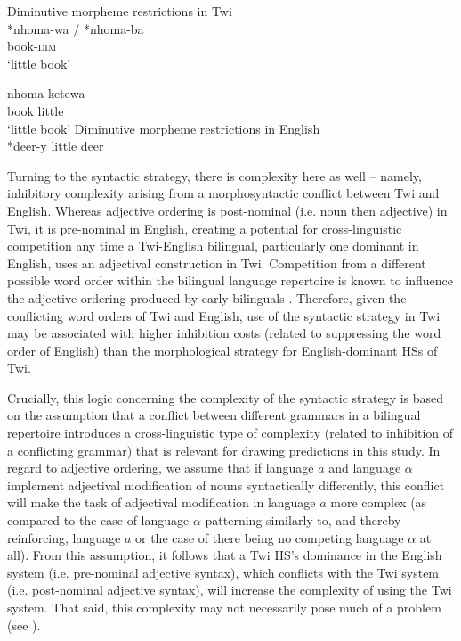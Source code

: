 \documentclass[output=paper,colorlinks,citecolor=brown]{langscibook}
\begin{document}
\ea \label{DimRestrictionsTwi}Diminutive morpheme restrictions in Twi\\
\ea
\gll  \label{ex:nhomawa}*nhoma-wa / *nhoma-ba \\
book-\textsc{dim} \\ 
\glt `little book'

\ex
\gll \label{ex:nhoma-ketewa}nhoma ketewa \\
book little \\
\glt `little book'
\z
\z
\pagebreak
\ea \label{DimRestrictionsEng}Diminutive morpheme restrictions in English\\
\ea \label{ex:deery}*deer-y
\ex \label{ex:little-deer}little deer
\z
\z


Turning to the syntactic strategy, there is complexity here as well -- namely, inhibitory complexity arising from a morphosyntactic conflict between Twi and English. Whereas adjective ordering is post-nominal (i.e. noun then adjective) in Twi, it is pre-nominal in English, creating a potential for cross-linguistic competition any time a Twi-English bilingual, particularly one dominant in English, uses an adjectival construction in Twi. Competition from a different possible word order within the bilingual language repertoire is known to influence the adjective ordering produced by early bilinguals \citep{Nicoladis2006}. Therefore, given the conflicting word orders of Twi and English, use of the syntactic strategy in Twi may be associated with higher inhibition costs (related to suppressing the word order of English) than the morphological strategy for English-dominant HSs of Twi.

Crucially, this logic concerning the complexity of the syntactic strategy is based on the assumption that a conflict between different grammars in a bilingual repertoire introduces a cross-linguistic type of complexity (related to inhibition of a conflicting grammar) that is relevant for drawing predictions in this study. In regard to adjective ordering, we assume that if language $a$ and language $\alpha$ implement adjectival modification of nouns syntactically differently, this conflict will make the task of adjectival modification in language $a$ more complex (as compared to the case of language $\alpha$ patterning similarly to, and thereby reinforcing, language $a$ or the case of there being no competing language $\alpha$ at all). From this assumption, it follows that a Twi HS's dominance in the English system (i.e. pre-nominal adjective syntax), which conflicts with the Twi system (i.e. post-nominal adjective syntax), will increase the complexity of using the Twi system. That said, this complexity may not necessarily pose much of a problem (see ).
\end{document}
